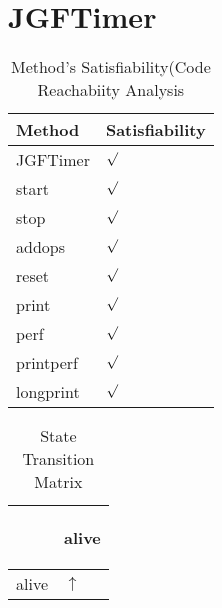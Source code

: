 \documentclass[10pt]{article}
\begin{document}
\section{{\color{Fuchsia}JGFTimer}}
\label{JGFTimer}
\begin{longtable}{|l|l|}
\caption{Method's Satisfiability(Code Reachabiity Analysis}\\
\hline
Method & Satisfiability\\
\hline
JGFTimer&{\color{blue}$\surd$}\\
\hline
start&{\color{blue}$\surd$}\\
\hline
stop&{\color{blue}$\surd$}\\
\hline
addops&{\color{blue}$\surd$}\\
\hline
reset&{\color{blue}$\surd$}\\
\hline
print&{\color{blue}$\surd$}\\
\hline
perf&{\color{blue}$\surd$}\\
\hline
printperf&{\color{blue}$\surd$}\\
\hline
longprint&{\color{blue}$\surd$}\\
\hline
\end{longtable}
\begin{longtable}{|l|l|}
\caption{State Transition Matrix}\\
\hline
&\begin{sideways}alive\end{sideways}\\
\hline
alive&{\color{blue}$\uparrow$}\\
\hline
\end{longtable}
\end{document}

